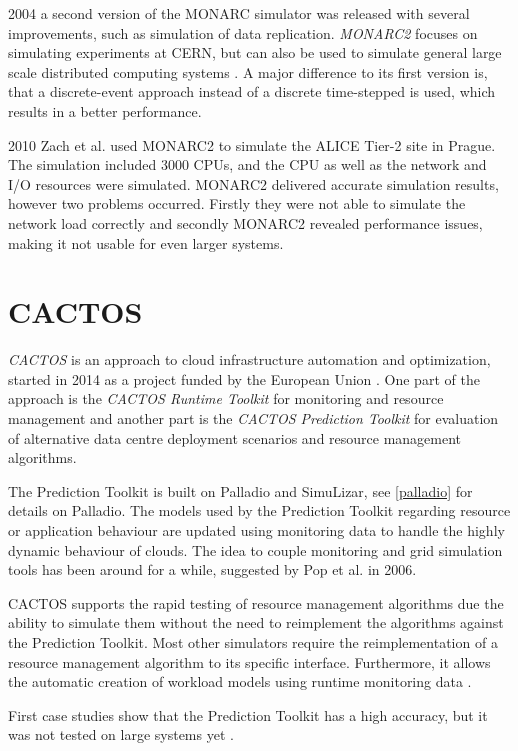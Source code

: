 2004 a second version of the MONARC simulator was released with several improvements, such as simulation of data replication. \textit{MONARC2} focuses on simulating experiments at CERN, but can also be used to simulate general large scale distributed computing systems \cite{legrand2003monarc}. A major difference to its first version is, that a discrete-event approach instead of a discrete time-stepped is used, which results in a better performance.

2010 Zach et al. \cite{1742-6596-331-7-072038} used MONARC2 to simulate the ALICE Tier-2 site in Prague. The simulation included 3000 CPUs, and the CPU as well as the network and I/O resources were simulated. MONARC2 delivered accurate simulation results, however two problems occurred. Firstly they were not able to simulate the network load correctly and secondly MONARC2 revealed performance issues, making it not usable for even larger systems.

\section{CACTOS}
\textit{CACTOS} is an approach to cloud infrastructure automation and optimization, started in 2014 as a project funded by the European Union \cite{cactos}.
One part of the approach is the \textit{CACTOS Runtime Toolkit} for monitoring and resource management and another part is the \textit{CACTOS Prediction Toolkit} for evaluation of alternative data centre deployment scenarios and resource management algorithms.

The Prediction Toolkit is built on Palladio and SimuLizar, see \cref{palladio} for details on Palladio.
The models used by the Prediction Toolkit regarding resource or application behaviour are updated using monitoring data to handle the highly dynamic behaviour of clouds.
The idea to couple monitoring and grid simulation tools has been around for a while, suggested by Pop et al. \cite{1698650} in 2006.

CACTOS supports the rapid testing of resource management algorithms due the ability to simulate them without the need to reimplement the algorithms against the Prediction Toolkit. Most other simulators require the reimplementation of a resource management algorithm to its specific interface. Furthermore, it allows the automatic creation of workload models  using runtime monitoring data \cite{rapidtesting}.

First case studies show that the Prediction Toolkit has a high accuracy, but it was not tested on large systems yet \cite{rapidtesting}.

